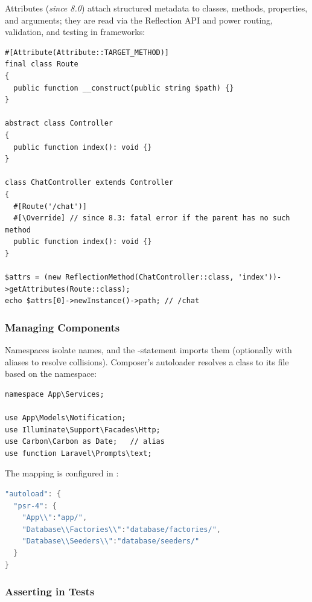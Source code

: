 Attributes (\emph{since 8.0}) attach structured metadata to classes, methods, properties, and
arguments; they are read via the Reflection API and power routing, validation, and testing in
frameworks:

\begin{lstlisting}
#[Attribute(Attribute::TARGET_METHOD)]
final class Route
{
  public function __construct(public string $path) {}
}

abstract class Controller
{
  public function index(): void {}
}

class ChatController extends Controller
{
  #[Route('/chat')]
  #[\Override] // since 8.3: fatal error if the parent has no such method
  public function index(): void {}
}

$attrs = (new ReflectionMethod(ChatController::class, 'index'))->getAttributes(Route::class);
echo $attrs[0]->newInstance()->path; // /chat
\end{lstlisting}


\newpage
\subsubsection{Managing Components}

Namespaces isolate names, and the -statement imports them (optionally with aliases to
resolve collisions). Composer's autoloader resolves a class to its file based on the namespace:

\begin{lstlisting}
namespace App\Services;

use App\Models\Notification;
use Illuminate\Support\Facades\Http;
use Carbon\Carbon as Date;   // alias
use function Laravel\Prompts\text;
\end{lstlisting}

\noindent The mapping is configured in :

\begin{lstlisting}[language=java]
"autoload": {
  "psr-4": {
    "App\\":"app/",
    "Database\\Factories\\":"database/factories/",
    "Database\\Seeders\\":"database/seeders/"
  }
}
\end{lstlisting}


\subsubsection{Asserting in Tests}

